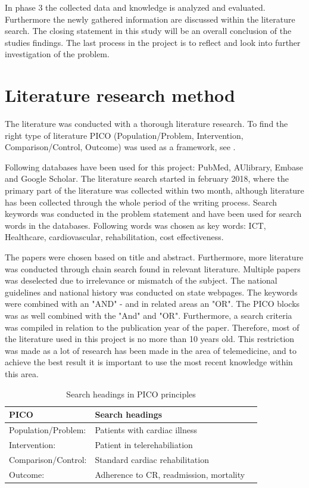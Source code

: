 In phase 3 the collected data and knowledge is analyzed and evaluated. Furthermore the newly gathered information are discussed within the literature search. The closing statement in this study will be an overall conclusion of the studies findings. The last process in the project is to reflect and look into further investigation of the problem. 


\section{Literature research method}
\label{literature}

The literature was conducted with a thorough literature research. To find the right type of literature PICO (Population/Problem, Intervention, Comparison/Control, Outcome) was used as a framework, see  \cite{pico}. 

Following databases have been used for this project: PubMed,  AUlibrary, Embase and Google Scholar. The literature search started in february 2018, where the primary part of the literature was collected within two month, although literature has been collected through the whole period of the writing process. Search keywords was conducted in the problem statement and have been used for search words in the databases. Following words was chosen as key words: ICT, Healthcare, cardiovascular, rehabilitation, cost effectiveness.

The papers were chosen based on title and abstract. Furthermore, more literature was conducted through chain search found in relevant literature. Multiple papers was deselected due to irrelevance or mismatch of the subject. The national guidelines and national history was conducted on state webpages. The keywords were combined with an "AND" - and in related areas an "OR". The PICO blocks was as well combined with the "And" and "OR". Furthermore, a search criteria was compiled in relation to the publication year of the paper.  Therefore, most of the literature used in this project is no more than 10 years old. This restriction was made as a lot of research has been made in the area of telemedicine, and to achieve the best result it is important to use the most recent knowledge within this area. 

\begin{table}[H]
\begin{longtabu} to 
    \textbf{PICO} &        \textbf{Search headings} \\[-1ex]
    \midrule
     Population/Problem:   &    Patients with cardiac illness \\ \hline
    Intervention:   &        Patient in telerehabiliation \\ \hline
    Comparison/Control:    &        Standard cardiac rehabilitation \\ \hline
    Outcome:    &        Adherence to CR, readmission, mortality 
    \newline
   \end{longtabu}
\caption{Search headings in PICO principles \cite{pico}}
\label{PICO}
\end{table}



